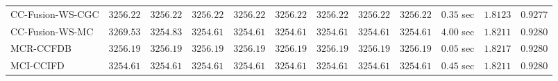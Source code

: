 \begin{table}[H]
\begin{tabular}{lrrrrrrrrrrr}
    CC-Fusion-WS-CGC & $      3256.22$ & $      3256.22$ & $      3256.22$ & $      3256.22$ & $      3256.22$ & $      3256.22$ & $      3256.22$ & $      3256.22$ & $         0.35$ sec    & $       1.8123$  & $       0.9277$ \\ 
     CC-Fusion-WS-MC & $      3269.53$ & $      3254.83$ & $      3254.61$ & $      3254.61$ & $      3254.61$ & $      3254.61$ & $      3254.61$ & $      3254.61$ & $         4.00$ sec    & $       1.8211$  & $       0.9280$ \\ 
\cmidrule{1-1} 
           MCR-CCFDB & $      3256.19$ & $      3256.19$ & $      3256.19$ & $      3256.19$ & $      3256.19$ & $      3256.19$ & $      3256.19$ & $      3256.19$ & $         0.05$ sec    & $       1.8217$  & $       0.9280$ \\ 
\cmidrule{1-1} 
           MCI-CCIFD & $      3254.61$ & $      3254.61$ & $      3254.61$ & $      3254.61$ & $      3254.61$ & $      3254.61$ & $      3254.61$ & $      3254.61$ & $         0.45$ sec    & $       1.8211$  & $       0.9280$ \\ 
\bottomrule
\end{tabular}
\end{table}

